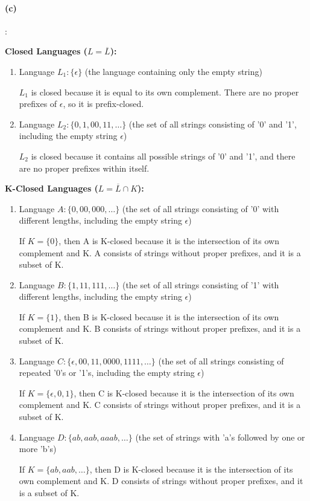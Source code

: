 \documentclass{article}
\begin{document}
\paragraph{(c)}:

\textbf{Closed Languages ($L = \overline{L}$):}

\begin{enumerate}
  \item Language $L_1: \{\epsilon\}$ (the language containing only the empty string)
  
  $L_1$ is closed because it is equal to its own complement. There are no proper prefixes of $\epsilon$, so it is prefix-closed.
  
  \item Language $L_2: \{0, 1, 00, 11, \ldots\}$ (the set of all strings consisting of '0' and '1', including the empty string $\epsilon$)
  
  $L_2$ is closed because it contains all possible strings of '0' and '1', and there are no proper prefixes within itself.
\end{enumerate}

\textbf{K-Closed Languages ($L = \overline{L} \cap K$):}

\begin{enumerate}
  \item Language $A: \{0, 00, 000, \ldots\}$ (the set of all strings consisting of '0' with different lengths, including the empty string $\epsilon$)
  
  If $K = \{0\}$, then A is K-closed because it is the intersection of its own complement and K. A consists of strings without proper prefixes, and it is a subset of K.
  
  \item Language $B: \{1, 11, 111, \ldots\}$ (the set of all strings consisting of '1' with different lengths, including the empty string $\epsilon$)
  
  If $K = \{1\}$, then B is K-closed because it is the intersection of its own complement and K. B consists of strings without proper prefixes, and it is a subset of K.

  \item Language $C: \{\epsilon, 00, 11, 0000, 1111, \ldots\}$ (the set of all strings consisting of repeated '0's or '1's, including the empty string $\epsilon$)
  
  If $K = \{\epsilon, 0, 1\}$, then C is K-closed because it is the intersection of its own complement and K. C consists of strings without proper prefixes, and it is a subset of K.

  \item Language $D: \{ab, aab, aaab, \ldots\}$ (the set of strings with 'a's followed by one or more 'b's)
  
  If $K = \{ab, aab, \ldots\}$, then D is K-closed because it is the intersection of its own complement and K. D consists of strings without proper prefixes, and it is a subset of K.

\end{enumerate}
\end{document}
